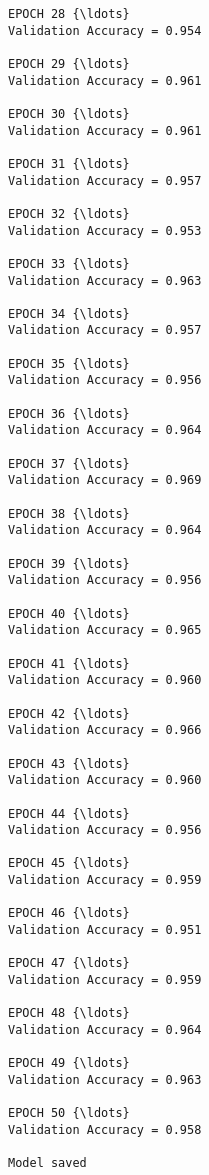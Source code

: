 \documentclass[11pt]{article}
\begin{document}
\begin{Verbatim}[commandchars=\\\{\}]
EPOCH 28 {\ldots}
Validation Accuracy = 0.954

EPOCH 29 {\ldots}
Validation Accuracy = 0.961

EPOCH 30 {\ldots}
Validation Accuracy = 0.961

EPOCH 31 {\ldots}
Validation Accuracy = 0.957

EPOCH 32 {\ldots}
Validation Accuracy = 0.953

EPOCH 33 {\ldots}
Validation Accuracy = 0.963

EPOCH 34 {\ldots}
Validation Accuracy = 0.957

EPOCH 35 {\ldots}
Validation Accuracy = 0.956

EPOCH 36 {\ldots}
Validation Accuracy = 0.964

EPOCH 37 {\ldots}
Validation Accuracy = 0.969

EPOCH 38 {\ldots}
Validation Accuracy = 0.964

EPOCH 39 {\ldots}
Validation Accuracy = 0.956

EPOCH 40 {\ldots}
Validation Accuracy = 0.965

EPOCH 41 {\ldots}
Validation Accuracy = 0.960

EPOCH 42 {\ldots}
Validation Accuracy = 0.966

EPOCH 43 {\ldots}
Validation Accuracy = 0.960

EPOCH 44 {\ldots}
Validation Accuracy = 0.956

EPOCH 45 {\ldots}
Validation Accuracy = 0.959

EPOCH 46 {\ldots}
Validation Accuracy = 0.951

EPOCH 47 {\ldots}
Validation Accuracy = 0.959

EPOCH 48 {\ldots}
Validation Accuracy = 0.964

EPOCH 49 {\ldots}
Validation Accuracy = 0.963

EPOCH 50 {\ldots}
Validation Accuracy = 0.958

Model saved

    \end{Verbatim}
\end{document}

